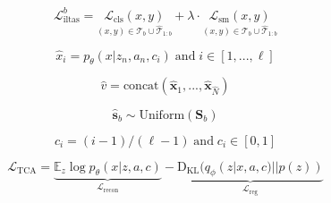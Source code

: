 \begin{equation*}\label{eq:iltas}
    \mathcal{L}^b_{\text{iltas}} = \underset{(x,y)\in\mathcal{T}_b\cup \hat{\mathcal{T}}_{1:b}}{\mathcal{L}_{\text{cls}}(x,y)} + \lambda \cdot \underset{(x,y)\in\mathcal{T}_b\cup \hat{\mathcal{T}}_{1:b}}{\mathcal{L}_{\text{sm}}(x,y)}
\end{equation*}

\begin{equation*}\label{eq:segfeat}
   \hat{x}_i = p_{\theta}(x|z_n, a_n, c_i)\; \text{and}\; {i \in [1,...,\ell]}
\end{equation*}

\begin{equation*}\label{eq:gen}
    \hat{v} = \text{concat}(\hat{\mathbf{x}}_1, ..., \hat{\mathbf{x}}_{\hat{N}})
\end{equation*}

\begin{equation*}\label{eq:sample}
    \hat{\mathbf{s}}_b \sim \text{Uniform}(\mathbf{S}_{b})
\end{equation*}

\begin{equation*}\label{eq:covar}
    c_i = (i-1)/(\ell-1)\; \text{and}\; c_i \in [0, 1]
\end{equation*}

\begin{equation*}\label{eq:tca}
    \mathcal{L}_{\text{TCA}} = \underbrace{\mathbb{E}_z \log p_{\theta}(x|z,a,c)}_{\mathcal{L}_{\text{recon}}} - \underbrace{\text{D}_{\text{KL}}(q_{\phi}(z|x,a,c)||p(z))}_{\mathcal{L}_{\text{reg}}}
\end{equation*}